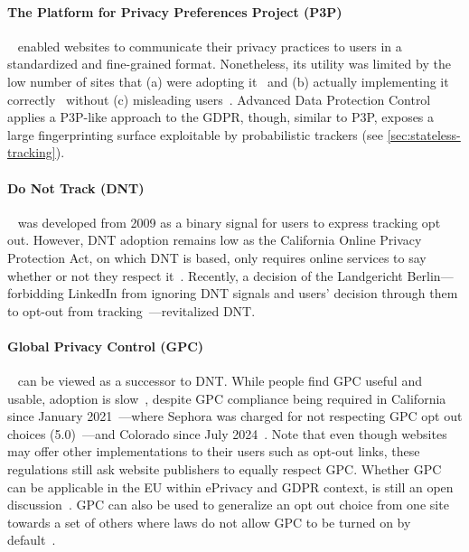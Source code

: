 \paragraph{The Platform for Privacy Preferences Project (P3P)}~\cite{reaglePlatformPrivacyPreferences1999,cranorPlatformPrivacyPreferences2002,cranorPlatformPrivacyPreferences2006} enabled websites to communicate their privacy practices to users in a standardized and fine-grained format. Nonetheless, its utility was limited by the low number of sites that (a) were adopting it~\cite{cranorUseP3PUser2002} and (b) actually implementing it correctly~\cite{cranorAnalysisP3PDeployment2003} without (c) misleading users~\cite{leonTokenAttemptMisrepresentation2010}. Advanced Data Protection Control~\cite{sustainablecomputinglabAdvancedDataProtection2022} applies a P3P-like approach to the GDPR, though, similar to P3P, exposes a large fingerprinting surface exploitable by probabilistic trackers (see \autoref{sec:stateless-tracking}).


\paragraph{Do Not Track (DNT)}~\cite{fieldingTrackingPreferenceExpression2019} was developed from 2009 as a binary signal for users to express tracking opt out. However, DNT adoption remains low as the California Online Privacy Protection Act, on which DNT is based, only requires online services to say whether or not they respect it~\cite{CaliforniaCodeBPC2003}. Recently, a decision of the Landgericht Berlin---forbidding LinkedIn from ignoring DNT signals and users' decision through them to opt-out from tracking~\cite{CourtProhibitsLinkedins2023}---revitalized DNT. 

\paragraph{Global Privacy Control (GPC)}~\cite{zimmeckGlobalPrivacyControl2024} can be viewed as a successor to DNT. While people find GPC useful and usable, adoption is slow~\cite{zimmeckUsabilityEnforceabilityGlobal2023,zimmeckGeneralizableActivePrivacy2024}, despite GPC compliance being required in California since January 2021~\cite{attorneygeneralbecerraCCPARequiresBusinesses2021}---where Sephora was charged for not respecting GPC opt out choices (5.0)~\cite{bontaAttorneyGeneralBonta2022}---and Colorado since July 2024~\cite{coloradodepartmentoflawUniversalOptOutShortlist2024}. Note that even though websites may offer other implementations to their users such as opt-out links, these regulations still ask website publishers to equally respect GPC.
Whether GPC can be applicable in the EU within ePrivacy and GDPR context, is still an open discussion~\cite{berjonGPCGDPR2021}. GPC can also be used to generalize an opt out choice from one site towards a set of others where laws do not allow GPC to be turned on by default~\cite{zimmeckGeneralizableActivePrivacy2024}.

